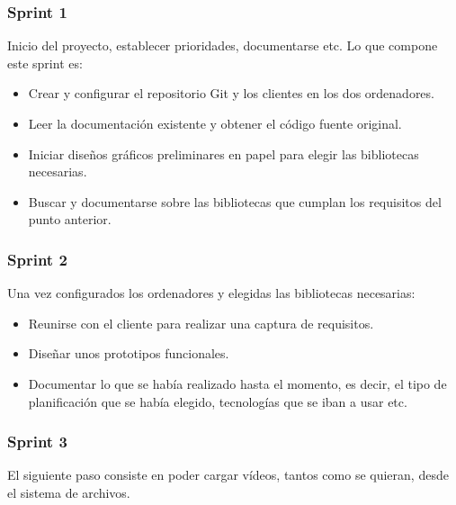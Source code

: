 \subsubsection{Sprint 1}
Inicio del proyecto, establecer prioridades, documentarse etc. Lo que compone este sprint es:

\begin{itemize}
    \item Crear y configurar el repositorio Git y los clientes en los dos ordenadores.
    \item Leer la documentaci\'{o}n existente y obtener el c\'{o}digo fuente original.
    \item Iniciar dise\~{n}os gr\'{a}ficos preliminares en papel para elegir las bibliotecas 
    necesarias.
    \item Buscar y documentarse sobre las bibliotecas que cumplan los requisitos del punto 
    anterior. 
\end{itemize} 

\subsubsection{Sprint 2}
Una vez configurados los ordenadores y elegidas las bibliotecas necesarias:

\begin{itemize}
    \item Reunirse con el cliente para realizar una captura de requisitos.
    \item Dise\~{n}ar unos prototipos funcionales.
    \item Documentar lo que se hab\'{i}a realizado hasta el momento, es decir, el tipo de 
    planificaci\'{o}n que se hab\'{i}a elegido,
    tecnolog\'{i}as que se iban a usar etc.
\end{itemize}

\subsubsection{Sprint 3}
El siguiente paso consiste en poder cargar v\'{i}deos, tantos como se quieran, desde el sistema de archivos.

